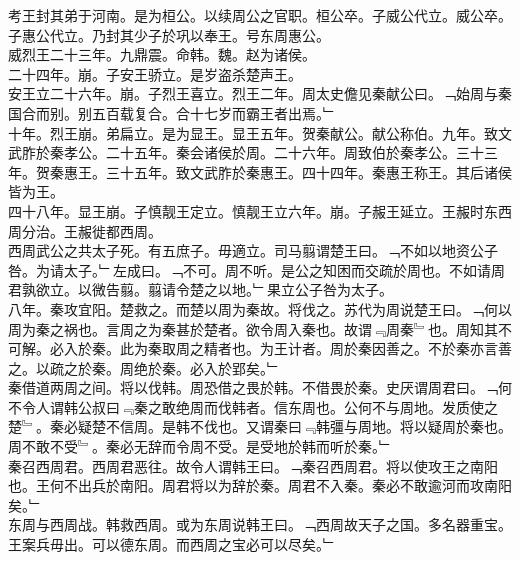 \documentclass{zhvt-classic}
\begin{document}
\hspace*{2em}考王封其弟于河南。是为桓公。以续周公之官职。桓公卒。子威公代立。威公卒。子惠公代立。乃封其少子於巩以奉王。号东周惠公。\\
\hspace*{2em}威烈王二十三年。九鼎震。命韩。魏。赵为诸侯。\\
\hspace*{2em}二十四年。崩。子安王骄立。是岁盗杀楚声王。\\
\hspace*{2em}安王立二十六年。崩。子烈王喜立。烈王二年。周太史儋见秦献公曰。﹁始周与秦国合而别。别五百载复合。合十七岁而霸王者出焉。﹂\\
\hspace*{2em}十年。烈王崩。弟扁立。是为显王。显王五年。贺秦献公。献公称伯。九年。致文武胙於秦孝公。二十五年。秦会诸侯於周。二十六年。周致伯於秦孝公。三十三年。贺秦惠王。三十五年。致文武胙於秦惠王。四十四年。秦惠王称王。其后诸侯皆为王。\\
\hspace*{2em}四十八年。显王崩。子慎靓王定立。慎靓王立六年。崩。子赧王延立。王赧时东西周分治。王赧徙都西周。\\
\hspace*{2em}西周武公之共太子死。有五庶子。毋適立。司马翦谓楚王曰。﹁不如以地资公子咎。为请太子。﹂左成曰。﹁不可。周不听。是公之知困而交疏於周也。不如请周君孰欲立。以微告翦。翦请令楚之以地。﹂果立公子咎为太子。\\
\hspace*{2em}八年。秦攻宜阳。楚救之。而楚以周为秦故。将伐之。苏代为周说楚王曰。﹁何以周为秦之祸也。言周之为秦甚於楚者。欲令周入秦也。故谓﹃周秦﹄也。周知其不可解。必入於秦。此为秦取周之精者也。为王计者。周於秦因善之。不於秦亦言善之。以疏之於秦。周绝於秦。必入於郢矣。﹂\\
\hspace*{2em}秦借道两周之间。将以伐韩。周恐借之畏於韩。不借畏於秦。史厌谓周君曰。﹁何不令人谓韩公叔曰﹃秦之敢绝周而伐韩者。信东周也。公何不与周地。发质使之楚﹄。秦必疑楚不信周。是韩不伐也。又谓秦曰﹃韩彊与周地。将以疑周於秦也。周不敢不受﹄。秦必无辞而令周不受。是受地於韩而听於秦。﹂\\
\hspace*{2em}秦召西周君。西周君恶往。故令人谓韩王曰。﹁秦召西周君。将以使攻王之南阳也。王何不出兵於南阳。周君将以为辞於秦。周君不入秦。秦必不敢逾河而攻南阳矣。﹂\\
\hspace*{2em}东周与西周战。韩救西周。或为东周说韩王曰。﹁西周故天子之国。多名器重宝。王案兵毋出。可以德东周。而西周之宝必可以尽矣。﹂\\
\end{document}
